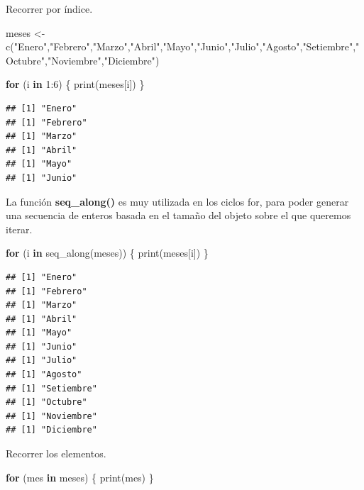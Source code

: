 \documentclass[
  12pt,
]{book}
\newenvironment{Shaded}{\begin{snugshade}}{\end{snugshade}}
\newcommand{\ControlFlowTok}[1]{\textcolor[rgb]{0.13,0.29,0.53}{\textbf{#1}}}
\newcommand{\DecValTok}[1]{\textcolor[rgb]{0.00,0.00,0.81}{#1}}
\newcommand{\FunctionTok}[1]{\textcolor[rgb]{0.00,0.00,0.00}{#1}}
\newcommand{\NormalTok}[1]{#1}
\newcommand{\OtherTok}[1]{\textcolor[rgb]{0.56,0.35,0.01}{#1}}
\newcommand{\SpecialCharTok}[1]{\textcolor[rgb]{0.00,0.00,0.00}{#1}}
\newcommand{\StringTok}[1]{\textcolor[rgb]{0.31,0.60,0.02}{#1}}
\begin{document}
Recorrer por índice.

\begin{Shaded}
\begin{Highlighting}[]
\NormalTok{meses }\OtherTok{\textless{}{-}} \FunctionTok{c}\NormalTok{(}\StringTok{"Enero"}\NormalTok{,}\StringTok{"Febrero"}\NormalTok{,}\StringTok{"Marzo"}\NormalTok{,}\StringTok{"Abril"}\NormalTok{,}\StringTok{"Mayo"}\NormalTok{,}\StringTok{"Junio"}\NormalTok{,}\StringTok{"Julio"}\NormalTok{,}\StringTok{"Agosto"}\NormalTok{,}\StringTok{"Setiembre"}\NormalTok{,}\StringTok{"Octubre"}\NormalTok{,}\StringTok{"Noviembre"}\NormalTok{,}\StringTok{"Diciembre"}\NormalTok{)}

\ControlFlowTok{for}\NormalTok{ (i }\ControlFlowTok{in} \DecValTok{1}\SpecialCharTok{:}\DecValTok{6}\NormalTok{) \{}
  \FunctionTok{print}\NormalTok{(meses[i])}
\NormalTok{\}}
\end{Highlighting}
\end{Shaded}

\begin{verbatim}
## [1] "Enero"
## [1] "Febrero"
## [1] "Marzo"
## [1] "Abril"
## [1] "Mayo"
## [1] "Junio"
\end{verbatim}

La función \textbf{seq\_along()} es muy utilizada en los ciclos for, para poder generar una secuencia de enteros basada en el tamaño del objeto sobre el que queremos iterar.

\begin{Shaded}
\begin{Highlighting}[]
\ControlFlowTok{for}\NormalTok{ (i }\ControlFlowTok{in} \FunctionTok{seq\_along}\NormalTok{(meses)) \{}
   \FunctionTok{print}\NormalTok{(meses[i])}
\NormalTok{\}}
\end{Highlighting}
\end{Shaded}

\begin{verbatim}
## [1] "Enero"
## [1] "Febrero"
## [1] "Marzo"
## [1] "Abril"
## [1] "Mayo"
## [1] "Junio"
## [1] "Julio"
## [1] "Agosto"
## [1] "Setiembre"
## [1] "Octubre"
## [1] "Noviembre"
## [1] "Diciembre"
\end{verbatim}

Recorrer los elementos.

\begin{Shaded}
\begin{Highlighting}[]
\ControlFlowTok{for}\NormalTok{ (mes }\ControlFlowTok{in}\NormalTok{ meses) \{}
  \FunctionTok{print}\NormalTok{(mes)}
\NormalTok{\}}
\end{Highlighting}
\end{Shaded}
\end{document}
